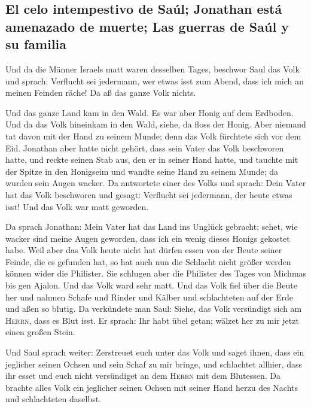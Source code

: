 \hypertarget{el-celo-intempestivo-de-sauxfal-jonathan-estuxe1-amenazado-de-muerte-las-guerras-de-sauxfal-y-su-familia}{%
\subsection{El celo intempestivo de Saúl; Jonathan está amenazado de
muerte; Las guerras de Saúl y su
familia}\label{el-celo-intempestivo-de-sauxfal-jonathan-estuxe1-amenazado-de-muerte-las-guerras-de-sauxfal-y-su-familia}}

 Und da die Männer Israels matt waren desselben Tages,
beschwor Saul das Volk und sprach: Verflucht sei jedermann, wer etwas
isst zum Abend, dass ich mich an meinen Feinden räche! Da aß das ganze
Volk nichts.

 Und das ganze Land kam in den Wald. Es war aber Honig
auf dem Erdboden.  Und da das Volk hineinkam in den Wald,
siehe, da floss der Honig. Aber niemand tat davon mit der Hand zu seinem
Munde; denn das Volk fürchtete sich vor dem Eid. 
Jonathan aber hatte nicht gehört, dass sein Vater das Volk beschworen
hatte, und reckte seinen Stab aus, den er in seiner Hand hatte, und
tauchte mit der Spitze in den Honigseim und wandte seine Hand zu seinem
Munde; da wurden sein Augen wacker.  Da antwortete einer
des Volks und sprach: Dein Vater hat das Volk beschworen und gesagt:
Verflucht sei jedermann, der heute etwas isst! Und das Volk war matt
geworden.

 Da sprach Jonathan: Mein Vater hat das Land ins Unglück
gebracht; sehet, wie wacker sind meine Augen geworden, dass ich ein
wenig dieses Honigs gekostet habe.  Weil aber das Volk
heute nicht hat dürfen essen von der Beute seiner Feinde, die es
gefunden hat, so hat auch nun die Schlacht nicht größer werden können
wider die Philister.  Sie schlugen aber die Philister des
Tages von Michmas bis gen Ajalon. Und das Volk ward sehr matt.
 Und das Volk fiel über die Beute her und nahmen Schafe
und Rinder und Kälber und schlachteten auf der Erde und aßen so blutig.
 Da verkündete man Saul: Siehe, das Volk versündigt sich
am \textsc{Herrn}, dass es Blut isst. Er sprach: Ihr habt übel getan;
wälzet her zu mir jetzt einen großen Stein.

 Und Saul sprach weiter: Zerstreuet euch unter das Volk
und saget ihnen, dass ein jeglicher seinen Ochsen und sein Schaf zu mir
bringe, und schlachtet allhier, dass ihr esset und euch nicht
versündiget an dem \textsc{Herrn} mit dem Blutessen. Da brachte alles
Volk ein jeglicher seinen Ochsen mit seiner Hand herzu des Nachts und
schlachteten daselbst.

